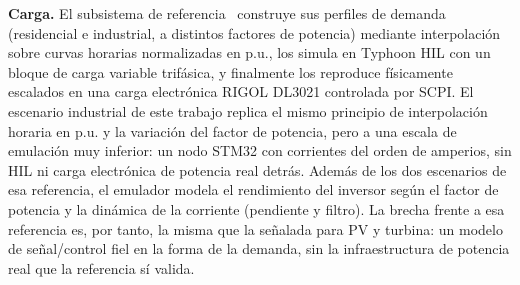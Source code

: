\documentclass[conference]{IEEEtran}
\begin{document}
\textbf{Carga.} El subsistema de referencia~\cite{hernandez2026carga} construye sus perfiles de demanda (residencial e industrial, a distintos factores de potencia) mediante interpolación sobre curvas horarias normalizadas en p.u., los simula en Typhoon HIL con un bloque de carga variable trifásica, y finalmente los reproduce físicamente escalados en una carga electrónica RIGOL DL3021 controlada por SCPI. El escenario industrial de este trabajo replica el mismo principio de interpolación horaria en p.u. y la variación del factor de potencia, pero a una escala de emulación muy inferior: un nodo STM32 con corrientes del orden de amperios, sin HIL ni carga electrónica de potencia real detrás. Además de los dos escenarios de esa referencia, el emulador modela el rendimiento del inversor según el factor de potencia y la dinámica de la corriente (pendiente y filtro). La brecha frente a esa referencia es, por tanto, la misma que la señalada para PV y turbina: un modelo de señal/control fiel en la forma de la demanda, sin la infraestructura de potencia real que la referencia sí valida.
\end{document}
